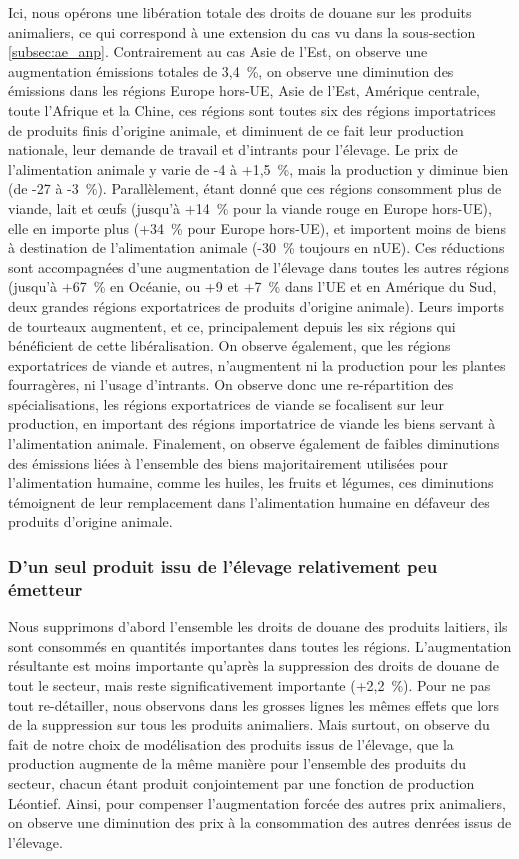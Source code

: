 Ici, nous opérons une libération totale des droits de douane sur les produits animaliers, ce qui correspond à une extension du cas vu dans la sous-section \ref{subsec:ae_anp}. Contrairement au cas Asie de l'Est, on observe une augmentation émissions totales de 3,4~\%, on observe une diminution des émissions dans les régions Europe hors-UE, Asie de l'Est, Amérique centrale, toute l'Afrique et la Chine, ces régions sont toutes six des régions importatrices de produits finis d'origine animale, et diminuent de ce fait leur production nationale, leur demande de travail et d'intrants pour l'élevage. Le prix de l'alimentation animale y varie de -4 à +1,5~\%, mais la production y diminue bien (de -27 à -3~\%). Parallèlement, étant donné que ces régions consomment plus de viande, lait et œufs (jusqu'à +14~\% pour la viande rouge en Europe hors-UE), elle en importe plus (+34~\% pour Europe hors-UE), et importent moins de biens à destination de l'alimentation animale (-30~\% toujours en nUE). Ces réductions sont accompagnées d'une augmentation de l'élevage dans toutes les autres régions (jusqu'à +67~\% en Océanie, ou +9 et +7~\% dans l'UE et en Amérique du Sud, deux grandes régions exportatrices de produits d'origine animale). Leurs imports de tourteaux augmentent, et ce, principalement depuis les six régions qui bénéficient de cette libéralisation. On observe également, que les régions exportatrices de viande et autres, n'augmentent ni la production pour les plantes fourragères, ni l'usage d'intrants. On observe donc une re-répartition des spécialisations, les régions exportatrices de viande se focalisent sur leur production, en important des régions importatrice de viande les biens servant à l'alimentation animale. Finalement, on observe également de faibles diminutions des émissions liées à l'ensemble des biens majoritairement utilisées pour l'alimentation humaine, comme les huiles, les fruits et légumes, ces diminutions témoignent de leur remplacement dans l'alimentation humaine en défaveur des produits d'origine animale.

\subsubsection{D'un seul produit issu de l'élevage relativement peu émetteur}

Nous supprimons d'abord l'ensemble les droits de douane des produits laitiers, ils sont consommés en quantités importantes dans toutes les régions. L'augmentation résultante est moins importante qu'après la suppression des droits de douane de tout le secteur, mais reste significativement importante (+2,2~\%). Pour ne pas tout re-détailler, nous observons dans les grosses lignes les mêmes effets que lors de la suppression sur tous les produits animaliers. Mais surtout, on observe du fait de notre choix de modélisation des produits issus de l'élevage, que la production augmente de la même manière pour l'ensemble des produits du secteur, chacun étant produit conjointement par une fonction de production Léontief. Ainsi, pour compenser l'augmentation forcée des autres prix animaliers, on observe une diminution des prix à la consommation des autres denrées issus de l'élevage.

